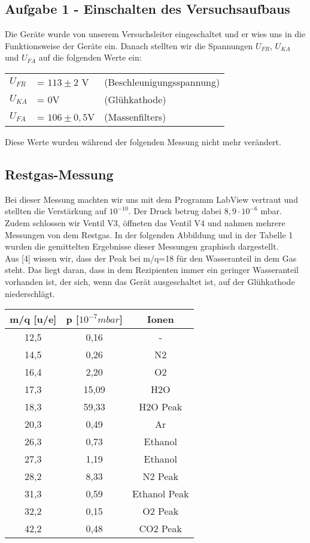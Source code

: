 \subsection{Aufgabe 1 - Einschalten des Versuchsaufbaus}
Die Geräte wurde von unserem Versuchsleiter eingeschaltet und er wies uns in die Funktionsweise der Geräte ein. Danach stellten wir die Spannungen $U_{FR}$, $U_{KA}$ und $U_{FA}$ auf die folgenden Werte ein:

\begin{tabular}{l|l|l}
$U_{FR}$ & = $113\pm 2$ V & (Beschleunigungsspannung)\\
$U_{KA}$ & = 0V & (Glühkathode)\\
$U_{FA}$ & = $106\pm 0,5$V & (Massenfilters)\\
\end{tabular}

Diese Werte wurden während der folgenden Messung nicht mehr verändert. 

\subsection{Restgas-Messung}
Bei dieser Messung machten wir uns mit dem Programm LabView vertraut und stellten die Verstärkung auf $10^{-10}$. Der Druck betrug dabei $8,9 \cdot 10^{-6}$ mbar. Zudem schlossen wir Ventil V3, öffneten das Ventil V4 und nahmen mehrere Messungen von dem Restgas. In der folgenden Abbildung und in der Tabelle 1 wurden die gemittelten Ergebnisse dieser Messungen graphisch dargestellt.\\
Aus [4] wissen wir, dass der Peak bei m/q=18 für den Wasseranteil in dem Gas steht. Das liegt daran, dass in dem Rezipienten immer ein geringer Wasseranteil vorhanden ist, der sich, wenn das Gerät ausgeschaltet ist, auf der Glühkathode niederschlägt.


\begin{center}
\begin{tabular}{c|c|c}
m/q [u/e] & p [$10^{-7} mbar$] & Ionen\\	
\hline	
12,5 &	0,16 & - \\
14,5 &	0,26 & N2\\
16,4 &	2,20 & O2\\
17,3 &	15,09 & H2O\\
18,3 &	59,33 & H2O Peak\\
20,3 &	0,49 & Ar\\
26,3 &	0,73 & Ethanol\\
27,3 &	1,19 & Ethanol\\
28,2 &	8,33 & N2 Peak\\
31,3 &	0,59 & Ethanol Peak\\
32,2 &	0,15 & O2 Peak\\
42,2 &	0,48 & CO2 Peak\\
\end{tabular}
\end{center}

